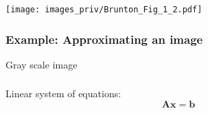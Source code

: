 \documentclass[english,10pt,aspectratio=169,fleqn]{beamer}
\begin{document}
\begin{frame}[plain]

\texttt{[image: images\_priv/Brunton\_Fig\_1\_2.pdf]}

\end{frame}


\begin{frame}
\frametitle{Example: Approximating an image}

Gray scale image

\end{frame}


\begin{frame}
\frametitle{}

Linear system of equations:
\begin{equation*}
\mathbf{A}\mathbf{x} = \mathbf{b}
\end{equation*}

\end{frame}
\end{document}
